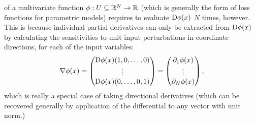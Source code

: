  of a multivariate function
\(\phi: U \subseteq \mathbb{R}^N \to \mathbb{R}\) (which is generally the form of loss functions for parametric
models) requires to evaluate \(\mathop{}\!\mathrm{D} \phi(x)\) \(N\) times, however.  This is because individual
partial derivatives can only be extracted from \(\mathop{}\!\mathrm{D} \phi(x)\) by calculating the sensitivities to
unit input perturbations in coordinate directions, for each of the input variables:
\begin{equation}
  \nabla \phi(x) = \begin{pmatrix}
    \mathop{}\!\mathrm{D} \phi(x)(1, 0, \ldots, 0)  \\
    \vdots \\
    \mathop{}\!\mathrm{D} \phi(x)(0, \ldots, 0, 1)
  \end{pmatrix} = \begin{pmatrix}
    \partial_1 \phi(x) \\
    \vdots \\
    \partial_N \phi(x)
  \end{pmatrix},
\end{equation}
which is really a special case of taking directional derivatives (which can be recovered generally
by application of the differential to any vector with unit norm.)

